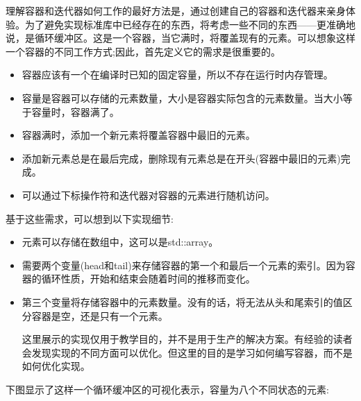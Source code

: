 
理解容器和迭代器如何工作的最好方法是，通过创建自己的容器和迭代器来亲身体验。为了避免实现标准库中已经存在的东西，将考虑一些不同的东西——更准确地说，是循环缓冲区。这是一个容器，当它满时，将覆盖现有的元素。可以想象这样一个容器的不同工作方式;因此，首先定义它的需求是很重要的。

\begin{itemize}
\item
容器应该有一个在编译时已知的固定容量，所以不存在运行时内存管理。

\item
容量是容器可以存储的元素数量，大小是容器实际包含的元素数量。当大小等于容量时，容器满了。

\item
容器满时，添加一个新元素将覆盖容器中最旧的元素。

\item
添加新元素总是在最后完成，删除现有元素总是在开头(容器中最旧的元素)完成。

\item
可以通过下标操作符和迭代器对容器的元素进行随机访问。
\end{itemize}

基于这些需求，可以想到以下实现细节:

\begin{itemize}
\item
元素可以存储在数组中，这可以是std::array。

\item
需要两个变量(head和tail)来存储容器的第一个和最后一个元素的索引。因为容器的循环性质，开始和结束会随着时间的推移而变化。

\item
第三个变量将存储容器中的元素数量。没有的话，将无法从头和尾索引的值区分容器是空，还是只有一个元素。

\begin{tcolorbox}[breakable,enhanced jigsaw,colback=blue!5!white,colframe=blue!75!black,title={重要的Note}]
这里展示的实现仅用于教学目的，并不是用于生产的解决方案。有经验的读者会发现实现的不同方面可以优化。但这里的目的是学习如何编写容器，而不是如何优化实现。
\end{tcolorbox}

\end{itemize}

下图显示了这样一个循环缓冲区的可视化表示，容量为八个不同状态的元素:

